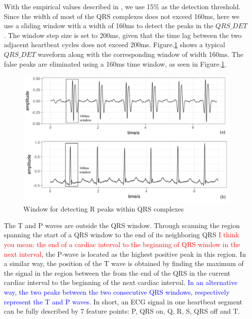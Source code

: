 With the empirical values described in \cite{2012qrs}, we use 15\% as the detection threshold. Since the width of most of the QRS complexes does not exceed 160ms, here we use a sliding window with a width of 160ms to detect the peaks in the $QRS\_DET$. The window step size is set to 200ms, given that the time lag between the two adjacent heartbeat cycles does not exceed 200ms.  Figure.\ref{fig:window} shows a typical $QRS\_DET$ waveform along with the corresponding window of width 160ms. The false peaks are eliminated using a 160ms time window, as seen in Figure.\ref{fig:window}.


\begin{figure}[t]
\centering
\includegraphics[scale=.5]{Fig/window.pdf}
\caption{Window for detecting R peaks within QRS complexes}
\label{fig:window}
\end{figure}


The T and P waves are outside the QRS window. Through scanning the region spanning the start of a QRS window to the end of its neighboring QRS \textcolor{red}{I think you mean: the end of a cardiac interval to the beginning of QRS window in the next interval}, the P-wave is located as the highest positive peak in this region. In a similar way, the position of the T wave is obtained by finding the maximum of the signal in the region between the from the end of the QRS in the current cardiac interval to the beginning of the next cardiac interval. \textcolor{blue}{In an alternative way, the two peaks between the two consecutive QRS windows, respectively represent the T and P waves.}
In short, an ECG signal in one heartbeat segment can be fully described by 7 feature points: P, QRS on, Q, R, S, QRS off and T. 

